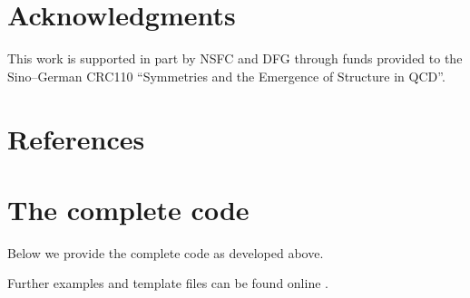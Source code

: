 \documentclass[12pt,ngerman,american]{iopart}
\begin{document}



\section*{Acknowledgments}

This work is supported in part by NSFC and DFG through funds provided to the
Sino--German CRC110 ``Symmetries and the Emergence of Structure in QCD''.



\appendix
\section*{References}



\clearpage
\section{The complete code}\label{sec:code}
Below we provide the complete code as developed above.

Further examples and template files can be found online \cite{scripts}.
\end{document}
